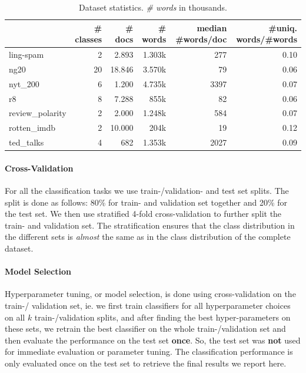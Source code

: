 \begin{table}[htb!]
\centering
\begin{tabular}{lrrrrr}
{} &  \# classes &  \# docs & \# words & median \#words/doc &  \#uniq. words/\#words \\
\midrule
ling-spam       & 2 &  2.893 &  1.303k & 277 & 0.10 \\
ng20            & 20 &  18.846 &  3.570k & 79 & 0.06 \\
nyt\_200         & 6 &  1.200 &  4.735k & 3397 & 0.07 \\
r8              & 8 &  7.288 &  855k & 82 & 0.06 \\
review\_polarity & 2 &  2.000 &  1.248k & 584 & 0.07 \\
rotten\_imdb     & 2 &  10.000 &  204k & 19 & 0.12 \\
ted\_talks       & 4 &  682 &  1.353k & 2027 & 0.09 \\
\bottomrule
\end{tabular}
\caption[Statistics: Datasets]{Dataset statistics. \textit{\# words} in thousands.}\label{table:dataset_statistics}
\end{table}



\paragraph{Cross-Validation}
For all the classification tasks we use train-/validation- and test set splits.
The split is done as follows: 80\% for train- and validation set together and 20\% for the test set.
We then use stratified 4-fold cross-validation to further split the train- and validation set.
The stratification ensures that the class distribution in the different sets is \textit{almost} the same as in the class distribution of the complete dataset.

\paragraph{Model Selection}
Hyperparameter tuning, or model selection, is done using cross-validation on the train-/ validation set, ie. we first train classifiers for all hyperparameter choices on all $k$ train-/validation splits, and after finding the best hyper-parameters on these sets, we retrain the best classifier on the whole train-/validation set and then evaluate the performance on the test set \textbf{once}.
So, the test set was \textbf{not} used for immediate evaluation or parameter tuning.
The classification performance is only evaluated once on the test set to retrieve the final results we report here.

